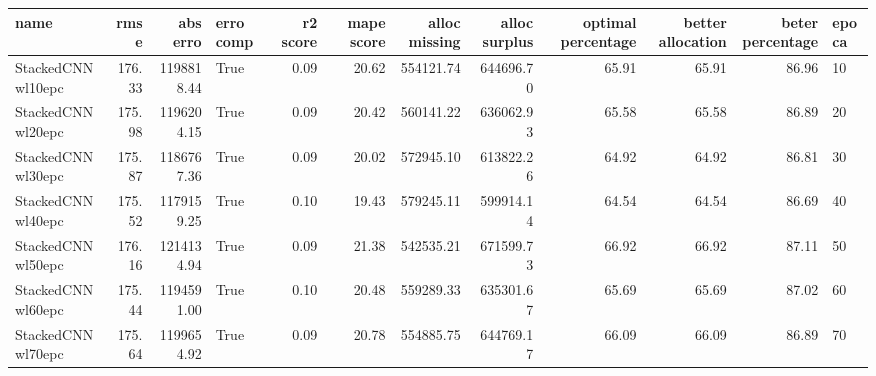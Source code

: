 \begin{tabular}{lrrlrrrrrrrl}
\toprule
name & rmse & abs erro & erro comp & r2 score & mape score & alloc missing & alloc surplus & optimal percentage & better allocation & beter percentage & epoca \\
\midrule
StackedCNNwl10epc & 176.33 & 1198818.44 & True & 0.09 & 20.62 & 554121.74 & 644696.70 & 65.91 & 65.91 & 86.96 & 10 \\
StackedCNNwl20epc & 175.98 & 1196204.15 & True & 0.09 & 20.42 & 560141.22 & 636062.93 & 65.58 & 65.58 & 86.89 & 20 \\
StackedCNNwl30epc & 175.87 & 1186767.36 & True & 0.09 & 20.02 & 572945.10 & 613822.26 & 64.92 & 64.92 & 86.81 & 30 \\
StackedCNNwl40epc & 175.52 & 1179159.25 & True & 0.10 & 19.43 & 579245.11 & 599914.14 & 64.54 & 64.54 & 86.69 & 40 \\
StackedCNNwl50epc & 176.16 & 1214134.94 & True & 0.09 & 21.38 & 542535.21 & 671599.73 & 66.92 & 66.92 & 87.11 & 50 \\
StackedCNNwl60epc & 175.44 & 1194591.00 & True & 0.10 & 20.48 & 559289.33 & 635301.67 & 65.69 & 65.69 & 87.02 & 60 \\
StackedCNNwl70epc & 175.64 & 1199654.92 & True & 0.09 & 20.78 & 554885.75 & 644769.17 & 66.09 & 66.09 & 86.89 & 70 \\
\bottomrule
\end{tabular}
